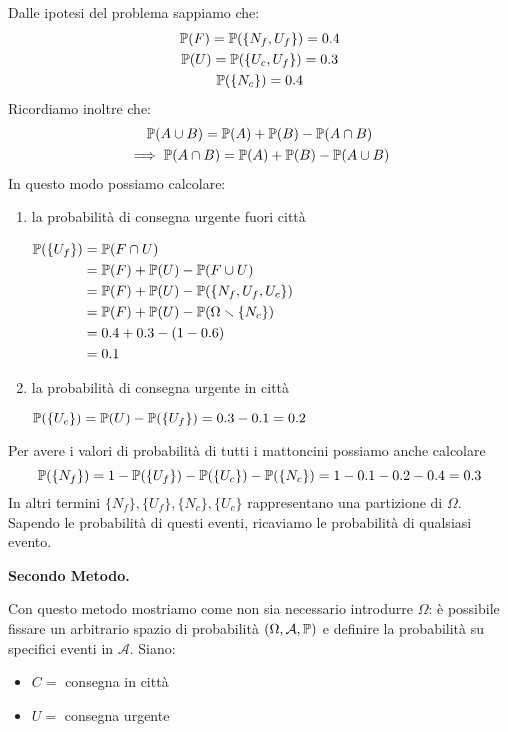 Dalle ipotesi del problema sappiamo che:
\begin{gather*}
\mathbb{P}( F) =\mathbb{P}(\{N_{f} ,U_{f}\}) =0.4\\
\mathbb{P}( U) =\mathbb{P}(\{U_{c} ,U_{f}\}) =0.3\\
\mathbb{P}(\{N_{c}\}) =0.4
\end{gather*}
Ricordiamo inoltre che:
\begin{gather*}
\mathbb{P}( A\cup B) =\mathbb{P}( A) +\mathbb{P}( B) -\mathbb{P}( A\cap B)\\
\implies  \mathbb{P}( A\cap B) =\mathbb{P}( A) +\mathbb{P}( B) -\mathbb{P}( A\cup B)
\end{gather*}
In questo modo possiamo calcolare:
\begin{enumerate}
\item la probabilità di consegna urgente fuori città

$\begin{aligned}
\mathbb{P}(\{U_{f}\}) & =\mathbb{P}( F\cap U)\\
 & =\mathbb{P}( F) +\mathbb{P}( U) -\mathbb{P}( F\cup U)\\
 & =\mathbb{P}( F) +\mathbb{P}( U) -\mathbb{P}(\{N_{f} ,U_{f} ,U_{c}\})\\
 & =\mathbb{P}( F) +\mathbb{P}( U) -\mathbb{P}( \Omega \smallsetminus \{N_{c}\})\\
 & =0.4+0.3-( 1-0.6)\\
 & =0.1
\end{aligned}$
\item la probabilità di consegna urgente in città

$\mathbb{P}(\{U_{c}\}) =\mathbb{P}( U) -\mathbb{P}(\{U_{f}\}) =0.3-0.1=0.2$
\end{enumerate}
\begin{oss}
Per avere i valori di probabilità di tutti i mattoncini possiamo anche calcolare
\begin{equation*}
\mathbb{P}(\{N_{f}\}) =1-\mathbb{P}(\{U_{f}\}) -\mathbb{P}(\{U_{c}\}) -\mathbb{P}(\{N_{c}\}) =1-0.1-0.2-0.4=0.3
\end{equation*}
In altri termini $\{N_{f}\} ,\{U_{f}\} ,\{N_{c}\} ,\{U_{c}\}$ rappresentano una partizione di $\Omega $. Sapendo le probabilità di questi eventi, ricaviamo le probabilità di qualsiasi evento.
\end{oss}


\textbf{Secondo Metodo.}

Con questo metodo mostriamo come non sia necessario introdurre $\Omega $: è possibile fissare un arbitrario spazio di probabilità $( \Omega ,\mathcal{A} ,\mathbb{P})$ e definire la probabilità su specifici eventi in $\mathcal{A}$. Siano:
\begin{itemize}
\item $C=$ consegna in città
\item $U=$ consegna urgente
\end{itemize}

